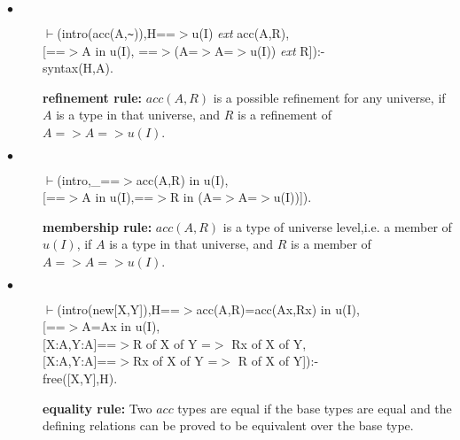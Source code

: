 \documentclass[11pt]{report}
\begin{document}
 \begin{description}
 \item[$\bullet$]
\begin{sf}\begin{tabbing}
$\vdash$(intro(acc(A,{\verb`~`})),H==$>$u(I) \mbox{\it ext} acc(A,R),\\[-0.15ex]
\hspace{2em}[==$>$A in u(I), ==$>$(A=$>$A=$>$u(I)) \mbox{\it ext} R]):-\\[-0.15ex]
\hspace{2em}syntax(H,A).
\end{tabbing}\end{sf}

 {\bf refinement rule:} $acc(A,R)$ is a possible refinement for any universe,
 if $A$ is a type in that universe, and $R$ is a refinement of $A=>A=>u(I)$.
 \item[$\bullet$]
\begin{sf}\begin{tabbing}
$\vdash$(intro,\_\hspace{0.1em}==$>$acc(A,R) in u(I),\\[-0.15ex]
\hspace{2em}[==$>$A in u(I),==$>$R in (A=$>$A=$>$u(I))]).
\end{tabbing}\end{sf}

 {\bf membership rule:} $acc(A,R)$ is a type of universe level,i.e. a member
 of $u(I)$, if $A$ is a type in that universe, and $R$ is a member of
 $A=>A=>u(I)$.
 \item[$\bullet$]
\begin{sf}\begin{tabbing}
$\vdash$(intro(new[X,Y]),H==$>$acc(A,R)=acc(Ax,Rx) in u(I),\\[-0.15ex]
\hspace{2em}[==$>$A=Ax in u(I),\\[-0.15ex]
\hspace{2em}[X:A,Y:A]==$>$R of X of Y =$>$ Rx of X of Y,\\[-0.15ex]
\hspace{2em}[X:A,Y:A]==$>$Rx of X of Y =$>$ R of X of Y]):-\\[-0.15ex]
\hspace{2em}free([X,Y],H).
\end{tabbing}\end{sf}

 {\bf equality rule:} Two $acc$ types are equal if the
 base types are equal and the defining relations can be proved to be
 equivalent over the base type.
 \end{description} %
\end{document}
